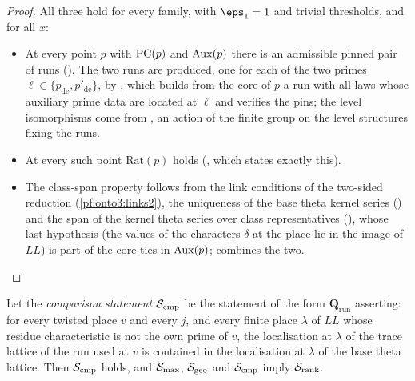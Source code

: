 \begin{proof}
All three hold for every family, with $\eps_1=1$ and trivial thresholds, and for all $x$:
\begin{itemize}
\item At every point $p$ with $\mathrm{PC}(p)$ and $\mathrm{Aux}(p)$ there is an admissible pinned pair of runs
(). The two runs are produced, one for each of the two
primes $\ell\in\{p_{\mathrm{de}},p'_{\mathrm{de}}\}$, by
, which builds from the core of
$p$ a run with all laws whose auxiliary prime data are located at $\ell$ and verifies the pins; the level
isomorphisms come from , an action of the
finite group on the level structures fixing the runs.
\item At every such point $\mathrm{Rat}(p)$ holds (, which
states exactly this).
\item The class-span property follows from the link conditions of the two-sided reduction
(\cref{pf:onto3:links2}), the uniqueness of the base theta kernel series
() and the span of the kernel theta series over class
representatives (), whose last
hypothesis (the values of the characters $\delta$ at the place lie in the image of $\mathit{LL}$) is part of the
core ties in $\mathrm{Aux}(p)$;  combines the two.\qedhere
\end{itemize}
\end{proof}

\begin{proposition}\label{pf:onto3:rank}
Let the \emph{comparison statement} $\mathcal{S}_{\mathrm{cmp}}$ be the statement of the form $\mathbf Q_{\mathrm{run}}$
asserting: for every twisted place $v$ and every $j$, and every finite place $\lambda$ of $\mathit{LL}$ whose residue
characteristic is not the own prime of $v$, the localisation at $\lambda$ of the trace lattice of the run used at
$v$ is contained in the localisation at $\lambda$ of the base theta lattice. Then $\mathcal{S}_{\mathrm{cmp}}$ holds, and
$\mathcal{S}_{\mathrm{max}}$, $\mathcal{S}_{\mathrm{geo}}$ and $\mathcal{S}_{\mathrm{cmp}}$ imply $\mathcal{S}_{\mathrm{rank}}$.
\end{proposition}

